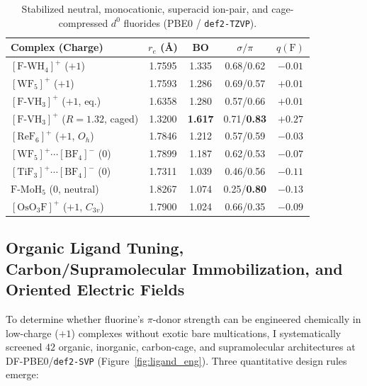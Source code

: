 \documentclass[10pt,twocolumn]{article}
\begin{document}
\begin{table}[t]
\centering
\caption{Stabilized neutral, monocationic, superacid ion-pair, and cage-compressed $d^0$ fluorides (PBE0 / \texttt{def2-TZVP}).}
\label{tab:superacid}
\scriptsize
\setlength{\tabcolsep}{1.8pt}
\begin{tabular}{@{}lcccc@{}}
\toprule
Complex (Charge) & $r_e$ (\AA) & BO & $\sigma/\pi$ & $q(\mathrm{F})$ \\
\midrule
$[\mathrm{F\text{-}WH_4}]^+$ ($+1$) & 1.7595 & 1.335 & 0.68/0.62 & $-0.01$ \\
$[\mathrm{WF}_5]^+$ ($+1$) & 1.7593 & 1.286 & 0.69/0.57 & $+0.01$ \\
$[\mathrm{F\text{-}VH_3}]^+$ ($+1$, eq.) & 1.6358 & 1.280 & 0.57/0.66 & $+0.01$ \\
$[\mathrm{F\text{-}VH_3}]^+$ ($R=1.32$, caged) & 1.3200 & \textbf{1.617} & 0.71/\textbf{0.83} & $+0.27$ \\
$[\mathrm{ReF}_6]^+$ ($+1$, $O_h$) & 1.7846 & 1.212 & 0.57/0.59 & $-0.03$ \\
$[\mathrm{WF}_5]^+\!\cdots\![\mathrm{BF}_4]^-$ ($0$) & 1.7899 & 1.187 & 0.62/0.53 & $-0.07$ \\
$[\mathrm{TiF}_3]^+\!\cdots\![\mathrm{BF}_4]^-$ ($0$) & 1.7311 & 1.039 & 0.46/0.56 & $-0.11$ \\
$\mathrm{F\text{-}MoH_5}$ ($0$, neutral) & 1.8267 & 1.074 & 0.25/\textbf{0.80} & $-0.13$ \\
$[\mathrm{OsO}_3\mathrm{F}]^+$ ($+1$, $C_{3v}$) & 1.7900 & 1.024 & 0.66/0.35 & $-0.09$ \\
\bottomrule
\end{tabular}
\end{table}

\subsection{Organic Ligand Tuning, Carbon/Supramolecular Immobilization, and Oriented Electric Fields}
To determine whether fluorine's $\pi$-donor strength can be engineered chemically in low-charge ($+1$) complexes without exotic bare multications, I systematically screened $42$ organic, inorganic, carbon-cage, and supramolecular architectures at DF-PBE0/\texttt{def2-SVP} (Figure~\ref{fig:ligand_eng}). Three quantitative design rules emerge:
\end{document}
